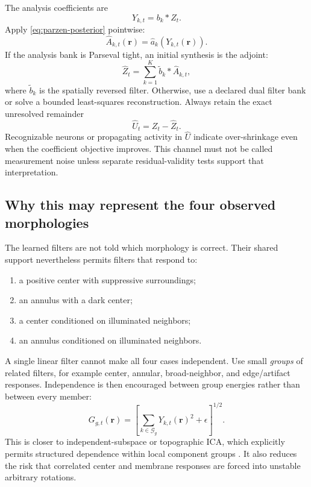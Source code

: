 \documentclass[11pt]{article}
\newcommand{\conv}{\mathbin{*}}
\begin{document}
The analysis coefficients are
\begin{equation}
Y_{k,t}=b_k\conv Z_t.
\end{equation}
Apply \cref{eq:parzen-posterior} pointwise:
\begin{equation}
\widehat A_{k,t}(\bm r)
=
\widehat a_k\!\left(Y_{k,t}(\bm r)\right).
\end{equation}
If the analysis bank is Parseval tight, an initial synthesis is the adjoint:
\begin{equation}
\widehat Z_t
=
\sum_{k=1}^{K}
\widetilde b_k\conv \widehat A_{k,t},
\label{eq:tight-synthesis}
\end{equation}
where $\widetilde b_k$ is the spatially reversed filter. Otherwise, use a
declared dual filter bank or solve a bounded least-squares reconstruction.
Always retain the exact unresolved remainder
\begin{equation}
\widehat U_t=Z_t-\widehat Z_t.
\label{eq:exact-remainder}
\end{equation}
Recognizable neurons or propagating activity in $\widehat U$ indicate
over-shrinkage even when the coefficient objective improves. This channel must
not be called measurement noise unless separate residual-validity tests support
that interpretation.

\subsection{Why this may represent the four observed morphologies}

The learned filters are not told which morphology is correct. Their shared
support nevertheless permits filters that respond to:
\begin{enumerate}[leftmargin=*]
\item a positive center with suppressive surroundings;
\item an annulus with a dark center;
\item a center conditioned on illuminated neighbors;
\item an annulus conditioned on illuminated neighbors.
\end{enumerate}
A single linear filter cannot make all four cases independent. Use small
\emph{groups} of related filters, for example center, annular, broad-neighbor,
and edge/artifact responses. Independence is then encouraged between group
energies rather than between every member:
\begin{equation}
G_{g,t}(\bm r)
=
\left[
\sum_{k\in\mathcal G_g}
Y_{k,t}(\bm r)^2+\epsilon
\right]^{1/2}.
\label{eq:group-energy}
\end{equation}
This is closer to independent-subspace or topographic ICA, which explicitly
permits structured dependence within local component groups
\cite{hyvarinen2001tica}. It also reduces the risk that correlated center and
membrane responses are forced into unstable arbitrary rotations.
\end{document}
